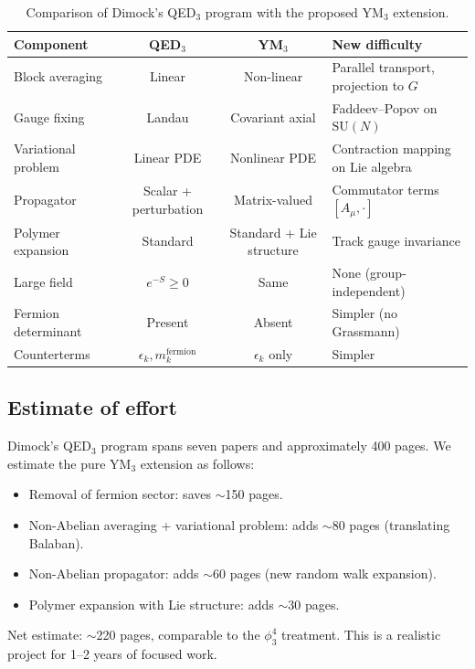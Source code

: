 \documentclass[11pt,a4paper]{article}
\theoremstyle{plain}
\theoremstyle{definition}
\theoremstyle{remark}
\newcommand{\SU}{\mathrm{SU}}
\begin{document}
\begin{table}[h]
\centering
\renewcommand{\arraystretch}{1.3}
\begin{tabular}{@{}p{4cm}ccp{4.5cm}@{}}
\toprule
\textbf{Component} & \textbf{QED$_3$} & \textbf{YM$_3$}
  & \textbf{New difficulty} \\
\midrule
Block averaging & Linear & Non-linear &
  Parallel transport, projection to $G$ \\
Gauge fixing & Landau & Covariant axial &
  Faddeev--Popov on $\SU(N)$ \\
Variational problem & Linear PDE & Nonlinear PDE &
  Contraction mapping on Lie algebra \\
Propagator & Scalar + perturbation &
  Matrix-valued & Commutator terms
  $[A_\mu, \cdot]$ \\
Polymer expansion & Standard & Standard +
  Lie structure & Track gauge invariance \\
Large field & $e^{-S} \ge 0$ & Same &
  None (group-independent) \\
Fermion determinant & Present & Absent &
  Simpler (no Grassmann) \\
Counterterms & $\epsilon_k, m_k^{\text{fermion}}$
  & $\epsilon_k$ only & Simpler \\
\bottomrule
\end{tabular}
\caption{Comparison of Dimock's QED$_3$ program
  with the proposed YM$_3$ extension.}
\label{tab:comparison}
\end{table}

\subsection{Estimate of effort}

Dimock's QED$_3$ program spans seven papers and
approximately 400 pages. We estimate the pure YM$_3$
extension as follows:
\begin{itemize}[nosep]
  \item Removal of fermion sector: saves $\sim$150 pages.
  \item Non-Abelian averaging + variational problem:
    adds $\sim$80 pages (translating Balaban).
  \item Non-Abelian propagator: adds $\sim$60 pages
    (new random walk expansion).
  \item Polymer expansion with Lie structure:
    adds $\sim$30 pages.
\end{itemize}
Net estimate: $\sim$220 pages, comparable to the
$\phi^4_3$ treatment. This is a realistic project
for 1--2 years of focused work.
\end{document}
